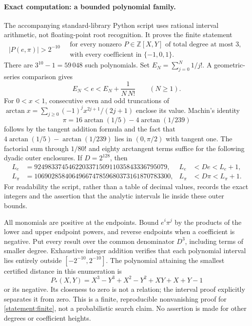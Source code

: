\documentclass[11pt,a4paper]{article}
\newcommand{\Z}{\mathbb{Z}}
\numberwithin{equation}{section}
\begin{document}
\paragraph{Exact computation: a bounded polynomial family.}
The accompanying standard-library Python script uses rational interval
arithmetic, not floating-point root recognition. It proves the finite
statement
\begin{equation}\label{statement:finite}
 \left|P(e,\pi)\right|>2^{-10}
 \quad\begin{gathered}
  \text{for every nonzero }P\in\Z[X,Y]\text{ of total degree at most }3,\\
  \text{with every coefficient in }\{-1,0,1\}.
 \end{gathered}
\end{equation}
There are $3^{10}-1=59\,048$ such polynomials. Set
$E_N=\sum_{j=0}^N1/j!$. A geometric-series comparison gives
\begin{equation}
 E_N<e<E_N+\frac1{N\,N!}\qquad(N\geq1).
\end{equation}
For $0<x<1$, consecutive even and odd truncations of
$\arctan x=\sum_{j\geq0}(-1)^j x^{2j+1}/(2j+1)$ enclose its value.
Machin's identity
\begin{equation}
 \pi=16\arctan(1/5)-4\arctan(1/239)
\end{equation}
follows by the tangent addition formula and the fact that
$4\arctan(1/5)-\arctan(1/239)$ lies in $(0,\pi/2)$ with tangent one.
The factorial sum through $1/80!$ and eighty arctangent terms suffice for the
following dyadic outer enclosures. If $D=2^{128}$, then
\begin{align*}
 L_e&=924983374546220337150911035843336795079,
 & L_e&<De<L_e+1,\\
 L_\pi&=1069028584064966747859680373161870783300,
 & L_\pi&<D\pi<L_\pi+1.
\end{align*}
For readability the script, rather than a table of decimal values,
records the exact integers and the assertion that the analytic
intervals lie inside these outer bounds.

All monomials are positive at the endpoints. Bound $e^i\pi^j$ by the
products of the lower and upper endpoint powers, and reverse endpoints
when a coefficient is negative. Put every result over the common
denominator $D^3$, including terms of smaller degree. Exhaustive
integer addition verifies that each polynomial interval lies entirely
outside $[-2^{-10},2^{-10}]$. The polynomial attaining the smallest
certified distance in this enumeration is
\begin{equation}
 P_*(X,Y)=X^3-Y^3+X^2-Y^2+XY+X+Y-1
\end{equation}
or its negative. Its closeness to zero is not a relation; the interval
proof explicitly separates it from zero. This is a finite, reproducible
nonvanishing proof for \eqref{statement:finite}, not a probabilistic search
claim. No assertion is made for other degrees or coefficient heights.
\end{document}
